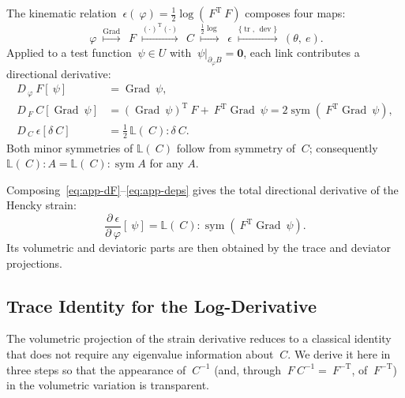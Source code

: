 \documentclass[12pt]{article}
\newcommand{\F}{~F}
\newcommand{\C}{~C}
\newcommand{\eps}{~\epsilon}
\newcommand{\edev}{~e}
\DeclareMathOperator{\trace}{tr}
\DeclareMathOperator{\dev}{dev}
\DeclareMathOperator{\Grad}{Grad}
\DeclareMathOperator{\sym}{sym}
\newcommand{\transpose}[1]{{#1}^{\mathrm{T}}}
\begin{document}
The kinematic relation
$\eps(~\varphi) = \tfrac{1}{2} \log(\transpose{\F} \F)$ composes four
maps:
\begin{equation}
  \label{eq:app-composition}
  ~\varphi
  \;\stackrel{\Grad}{\longmapsto}\;
  \F
  \;\stackrel{\transpose{(\cdot)}(\cdot)}{\longmapsto}\;
  \C
  \;\stackrel{\tfrac{1}{2}\log}{\longmapsto}\;
  \eps
  \;\stackrel{\{\trace,\,\dev\}}{\longmapsto}\;
  (\theta, \edev).
\end{equation}
Applied to a test function $~\psi \in U$ with
$~\psi|_{\partial_\varphi B} = \mathbf{0}$, each link contributes a
directional derivative:
\begin{subequations}
  \label{eq:app-links}
  \begin{align}
    D_{~\varphi}\F[~\psi]
      & = \Grad ~\psi,
      \label{eq:app-dF}
    \\
    D_{\F}\C[\Grad ~\psi]
      & = \transpose{(\Grad ~\psi)}\F + \transpose{\F}\Grad ~\psi
        = 2 \sym\!\left(\transpose{\F}\Grad ~\psi\right),
      \label{eq:app-dC}
    \\
    D_{\C}\eps[\delta \C]
      & = \tfrac{1}{2}\,\mathbb{L}(\C) : \delta \C.
      \label{eq:app-deps}
  \end{align}
\end{subequations}
Both minor symmetries of $\mathbb{L}(\C)$ follow from symmetry of
$\C$; consequently
$\mathbb{L}(\C) : A = \mathbb{L}(\C) : \sym A$ for any $A$.

Composing~\eqref{eq:app-dF}--\eqref{eq:app-deps} gives the total
directional derivative of the Hencky strain:
\begin{equation}
  \label{eq:app-deps-total}
  \frac{\partial \eps}{\partial ~\varphi}[~\psi]
  =
  \mathbb{L}(\C) : \sym\!\left(\transpose{\F}\Grad ~\psi\right).
\end{equation}
Its volumetric and deviatoric parts are then obtained by the trace
and deviator projections.

\subsection{Trace Identity for the Log-Derivative}
\label{app:trace-identity}

The volumetric projection of the strain derivative reduces to a
classical identity that does not require any eigenvalue information
about $\C$. We derive it here in three steps so that the appearance
of $\C^{-1}$ (and, through $\F\C^{-1} = \F^{-\mathrm{T}}$, of
$\F^{-\mathrm{T}}$) in the volumetric variation is transparent.
\end{document}
